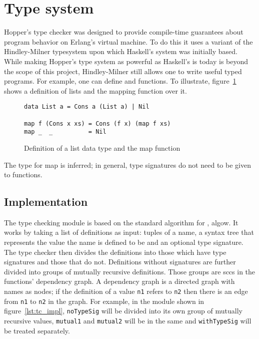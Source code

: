 \section{Type system}
\label{sec:dai_tc}



Hopper's type checker was designed to provide compile-time guarantees about program behavior on Erlang's virtual machine. To do this it uses a variant of the Hindley-Milner \cite{TypeSchemes} \gls{typesystem} upon which Haskell's system was initially based. While making Hopper's type system as powerful as Haskell's is today is beyond the scope of this project, Hindley-Milner still allows one to write useful typed programs. For example, one can define  and functions. To illustrate, figure~\ref{lst:tc_map} shows a definition of lists and the mapping function over it. 

\begin{figure}[!htb]
\centering
\begin{minipage}[b]{0.68\linewidth}
\centering
\begin{lstlisting}
data List a = Cons a (List a) | Nil

map f (Cons x xs) = Cons (f x) (map f xs)
map _  _          = Nil
\end{lstlisting}
\end{minipage}
\caption{Definition of a list data type and the map function}
\label{lst:tc_map}
\end{figure}

The type for map is inferred; in general, type signatures do not need to be given to functions.

\subsection{Implementation}

The type checking module is based on the standard algorithm for , \Gls{algow}. It works by taking a list of definitions as input: tuples of a name, a syntax tree that represents the value the name is defined to be and an optional type signature. The type checker then divides the definitions into those which have type signatures and those that do not. Definitions without signatures are further divided into groups of mutually recursive definitions. Those groups are \glspl{scc} in the functions' dependency graph. A dependency graph is a directed graph with names as nodes; if the definition of a value \texttt{n1} refers to \texttt{n2} then there is an edge from \texttt{n1} to \texttt{n2} in the graph. For example, in the module shown in figure~\ref{lst:tc_impl}, \texttt{noTypeSig} will be divided into its own group of mutually recursive values, \texttt{mutual1} and \texttt{mutual2} will be in the same and \texttt{withTypeSig} will be treated separately. 

